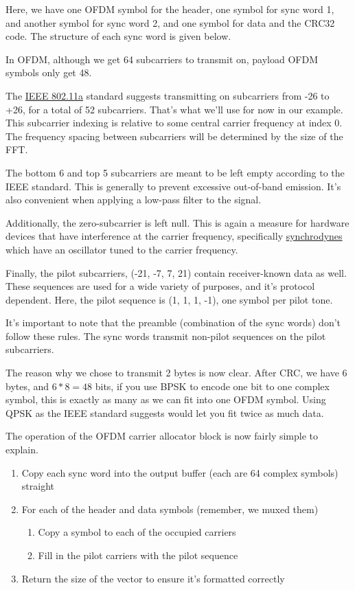 \documentclass[11pt]{article}
\begin{document}
Here, we have one OFDM symbol for the header, one symbol for sync word
1, and another symbol for sync word 2, and one symbol for data and the
CRC32 code. The structure of each sync word is given below.

In OFDM, although we get 64 subcarriers to transmit on, payload OFDM
symbols only get 48.

The \href{https://notes.esrh.me/ieee802\_11.html}{IEEE 802.11a} standard suggests transmitting on subcarriers from
-26 to +26, for a total of 52 subcarriers. That's what we'll use for
now in our example. This subcarrier indexing is relative to some
central carrier frequency at index 0. The frequency spacing between
subcarriers will be determined by the size of the FFT.

The bottom 6 and top 5 subcarriers are meant to be left empty
according to the IEEE standard. This is generally to prevent excessive
out-of-band emission. It's also convenient when applying a low-pass
filter to the signal.

Additionally, the zero-subcarrier is left null. This is again a
measure for hardware devices that have interference at the carrier
frequency, specifically \href{https://en.wikipedia.org/wiki/Direct-conversion\_receiver}{synchrodynes} which have an oscillator tuned to
the carrier frequency.

Finally, the pilot subcarriers, (-21, -7, 7, 21) contain
receiver-known data as well. These sequences are used for a wide
variety of purposes, and it's protocol dependent. Here, the pilot
sequence is (1, 1, 1, -1), one symbol per pilot tone.

It's important to note that the preamble (combination of the sync
words) don't follow these rules. The sync words transmit
non-pilot sequences on the pilot subcarriers.

The reason why we chose to transmit 2 bytes is now clear. After CRC,
we have 6 bytes, and \(6 * 8 = 48\) bits, if you use BPSK to encode one
bit to one complex symbol, this is exactly as many as we can fit into
one OFDM symbol. Using QPSK as the IEEE standard suggests would let
you fit twice as much data.

The operation of the OFDM carrier allocator block is now fairly simple
to explain.

\begin{enumerate}
\item Copy each sync word into the output buffer (each are 64 complex
symbols) straight
\item For each of the header and data symbols (remember, we muxed them)
\begin{enumerate}
\item Copy a symbol to each of the occupied carriers
\item Fill in the pilot carriers with the pilot sequence
\end{enumerate}
\item Return the size of the vector to ensure it's formatted correctly
\end{enumerate}
\end{document}
